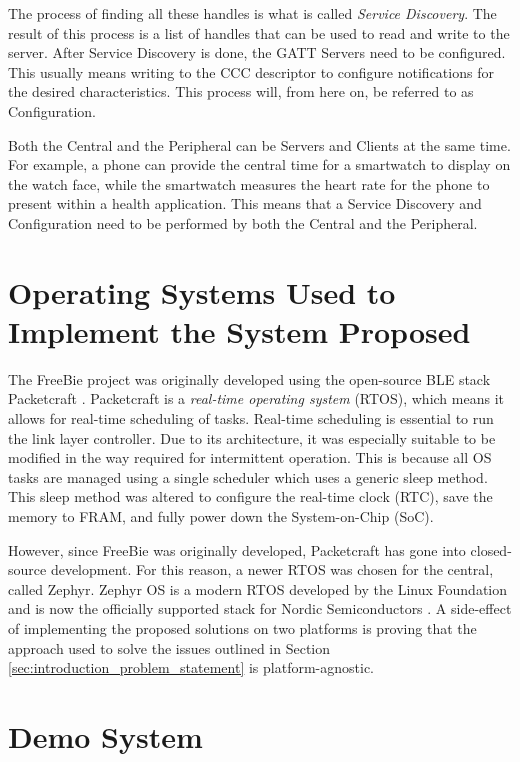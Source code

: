 The process of finding all these handles is what is called \textit{Service Discovery}. The result of this process is a list of handles that can be used to read and write to the server. After Service Discovery is done, the GATT Servers need to be configured. This usually means writing to the CCC descriptor to configure notifications for the desired characteristics. This process will, from here on, be referred to as Configuration. 

Both the Central and the Peripheral can be Servers and Clients at the same time. For example, a phone can provide the central time for a smartwatch to display on the watch face, while the smartwatch measures the heart rate for the phone to present within a health application. This means that a Service Discovery and Configuration need to be performed by both the Central and the Peripheral.

\section{Operating Systems Used to Implement the System Proposed}
The FreeBie project was originally developed using the open-source BLE stack Packetcraft \cite{packetcraft}. Packetcraft is a \textit{real-time operating system} (RTOS), which means it allows for real-time scheduling of tasks. Real-time scheduling is essential to run the link layer controller. Due to its architecture, it was especially suitable to be modified in the way required for intermittent operation. This is because all OS tasks are managed using a single scheduler which uses a generic sleep method. This sleep method was altered to configure the real-time clock (RTC), save the memory to FRAM, and fully power down the System-on-Chip (SoC).

However, since FreeBie was originally developed, Packetcraft has gone into closed-source development. For this reason, a newer RTOS was chosen for the central, called Zephyr. Zephyr OS is a modern RTOS developed by the Linux Foundation and is now the officially supported stack for Nordic Semiconductors \cite{zephyrproject}. A side-effect of implementing the proposed solutions on two platforms is proving that the approach used to solve the issues outlined in Section \ref{sec:introduction_problem_statement} is platform-agnostic.

\section{Demo System}
\label{sec:demo_application}

